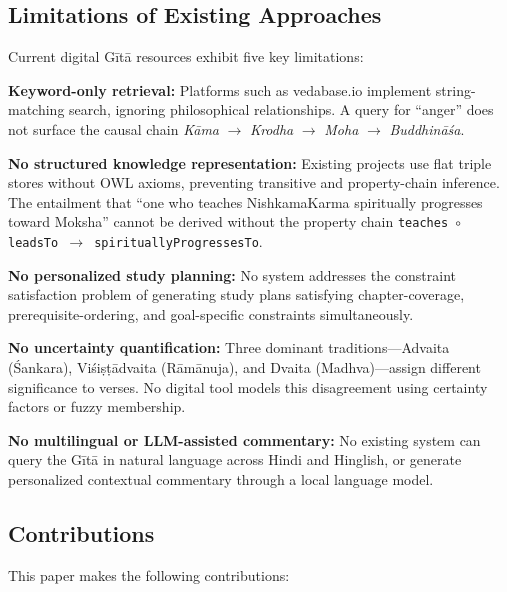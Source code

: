 \documentclass[conference]{IEEEtran}
\begin{document}
\subsection{Limitations of Existing Approaches}

Current digital G\={i}t\={a} resources exhibit five key limitations:

\textbf{Keyword-only retrieval:} Platforms such as vedabase.io implement
string-matching search, ignoring philosophical relationships. A query for
``anger'' does not surface the causal chain
\textit{K\={a}ma} $\to$ \textit{Krodha} $\to$ \textit{Moha}
$\to$ \textit{Buddhin\={a}\'{s}a}.

\textbf{No structured knowledge representation:} Existing projects use flat
triple stores without OWL axioms, preventing transitive and property-chain
inference. The entailment that ``one who teaches NishkamaKarma spiritually
progresses toward Moksha'' cannot be derived without the property chain
\texttt{teaches $\circ$ leadsTo $\to$ spirituallyProgressesTo}.

\textbf{No personalized study planning:} No system addresses the constraint
satisfaction problem of generating study plans satisfying chapter-coverage,
prerequisite-ordering, and goal-specific constraints simultaneously.

\textbf{No uncertainty quantification:} Three dominant traditions—Advaita
(\'Sankara), Vi\'si\d{s}\d{t}\={a}dvaita (R\={a}m\={a}nuja), and Dvaita
(Madhva)—assign different significance to verses. No digital tool models this
disagreement using certainty factors or fuzzy membership.

\textbf{No multilingual or LLM-assisted commentary:} No existing system can
query the G\={i}t\={a} in natural language across Hindi and Hinglish, or
generate personalized contextual commentary through a local language model.

\subsection{Contributions}

This paper makes the following contributions:
\end{document}
